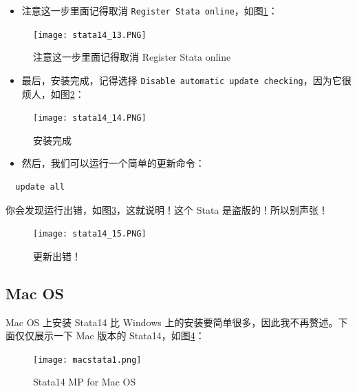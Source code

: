 \documentclass[cn,fancy,blue,11pt]{elegantbook}
\begin{document}
\begin{itemize}
\item
  注意这一步里面记得取消 \lstinline{Register Stata online}，如图\ref{fig:stata14_13}：
\end{itemize}

\begin{figure}[htbp]
  \centering
  \texttt{[image: stata14\_13.PNG]}
  \caption{注意这一步里面记得取消 Register Stata online}
  \label{fig:stata14_13}
\end{figure}

\begin{itemize}
\item
  最后，安装完成，记得选择 \lstinline{Disable automatic update checking}，因为它很烦人，如图\ref{fig:stata14_14}：
\end{itemize}

\begin{figure}[htbp]
  \centering
  \texttt{[image: stata14\_14.PNG]}
  \caption{安装完成}
  \label{fig:stata14_14}
\end{figure}

\begin{itemize}
\item
  然后，我们可以运行一个简单的更新命令：
\end{itemize}

\begin{lstlisting}
  update all
\end{lstlisting}

你会发现运行出错，如图\ref{fig:stata14_15}，这就说明！这个 Stata 是盗版的！所以别声张！

\begin{figure}[htbp]
  \centering
  \texttt{[image: stata14\_15.PNG]}
  \caption{更新出错！}
  \label{fig:stata14_15}
\end{figure}


\hypertarget{mac-os}{%
\subsection{Mac OS}\label{mac-os}}

Mac OS 上安装 Stata14 比 Windows 上的安装要简单很多，因此我不再赘述。下面仅仅展示一下 Mac 版本的 Stata14，如图\ref{fig:macstata1}：

\begin{figure}[htbp]
  \centering
  \texttt{[image: macstata1.png]}
  \caption{Stata14 MP for Mac OS}
  \label{fig:macstata1}
\end{figure}
\end{document}

